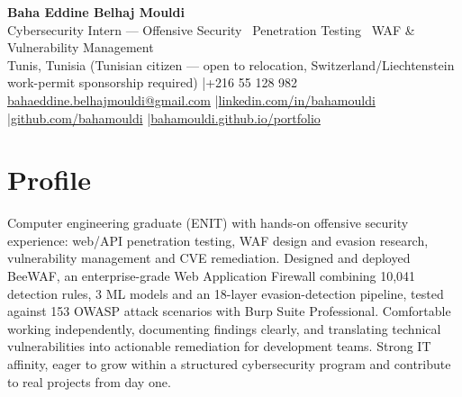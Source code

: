 \documentclass[a4paper,10pt]{article}
\begin{document}
\begin{center}
{\LARGE\bfseries\color{navy} Baha Eddine Belhaj Mouldi}\\[4pt]
{\large Cybersecurity Intern --- Offensive Security \textbar\ Penetration Testing \textbar\ WAF \& Vulnerability Management}\\[3pt]
Tunis, Tunisia (Tunisian citizen --- open to relocation, Switzerland/Liechtenstein work-permit sponsorship required) \quad|\quad +216 55 128 982\\[1pt]
\href{mailto:bahaeddine.belhajmouldi@gmail.com}{bahaeddine.belhajmouldi@gmail.com} \quad|\quad \href{https://www.linkedin.com/in/bahamouldi}{linkedin.com/in/bahamouldi} \quad|\quad \href{https://github.com/bahamouldi}{github.com/bahamouldi} \quad|\quad \href{https://bahamouldi.github.io/portfolio/}{bahamouldi.github.io/portfolio}
\end{center}
\vspace{1pt}
\section{Profile}
Computer engineering graduate (ENIT) with hands-on offensive security experience: web/API penetration testing, WAF design and evasion research, vulnerability management and CVE remediation. Designed and deployed BeeWAF, an enterprise-grade Web Application Firewall combining 10,041 detection rules, 3 ML models and an 18-layer evasion-detection pipeline, tested against 153 OWASP attack scenarios with Burp Suite Professional. Comfortable working independently, documenting findings clearly, and translating technical vulnerabilities into actionable remediation for development teams. Strong IT affinity, eager to grow within a structured cybersecurity program and contribute to real projects from day one.
\end{document}
